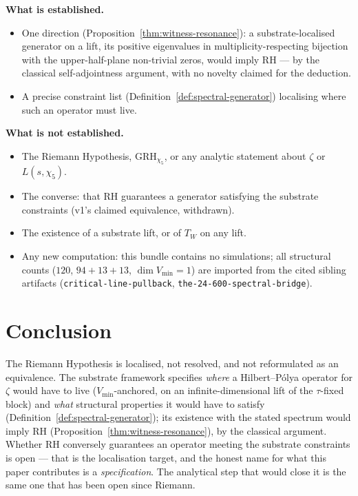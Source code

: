 \documentclass[11pt,a4paper]{article}
\newcommand{\Vmin}{V_{\min}}
\newcommand{\Twit}{T_W}
\begin{document}
\begin{scopebox}
\textbf{What is established.}
\begin{itemize}[leftmargin=*]
  \item One direction (Proposition~\ref{thm:witness-resonance}):
        a substrate-localised generator on a lift, its positive
        eigenvalues in multiplicity-respecting bijection with the
        upper-half-plane non-trivial zeros, would imply
        RH --- by the classical self-adjointness argument, with no
        novelty claimed for the deduction.
  \item A precise constraint list
        (Definition~\ref{def:spectral-generator}) localising where
        such an operator must live.
\end{itemize}

\textbf{What is not established.}
\begin{itemize}[leftmargin=*]
  \item The Riemann Hypothesis, $\mathrm{GRH}_{\chi_5}$, or any
        analytic statement about $\zeta$ or $L(s,\chi_5)$.
  \item The converse: that RH guarantees a generator satisfying
        the substrate constraints (v1's claimed equivalence,
        withdrawn).
  \item The existence of a substrate lift, or of $\Twit$ on any
        lift.
  \item Any new computation: this bundle contains no simulations;
        all structural counts ($120$, $94{+}13{+}13$,
        $\dim\Vmin=1$) are imported from the cited sibling
        artifacts (\texttt{critical-line-pullback},
        \texttt{the-24-600-spectral-bridge}).
\end{itemize}
\end{scopebox}

\section{Conclusion}
\label{sec:conclusion}

The Riemann Hypothesis is localised, not resolved, and not
reformulated as an equivalence. The substrate framework specifies
\emph{where} a Hilbert--P\'olya operator for $\zeta$ would have
to live ($\Vmin$-anchored, on an infinite-dimensional lift of the
$\tau$-fixed block) and \emph{what} structural properties it
would have to satisfy
(Definition~\ref{def:spectral-generator}); its existence with the
stated spectrum would imply RH
(Proposition~\ref{thm:witness-resonance}), by the classical
argument. Whether RH conversely guarantees an operator meeting the
substrate constraints is open --- that is the localisation target,
and the honest name for what this paper contributes is a
\emph{specification}. The analytical step that would close it is
the same one that has been open since Riemann.
\end{document}
